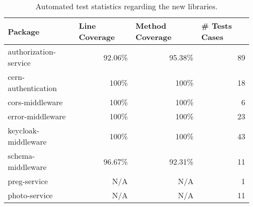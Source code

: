 \begin{table}[htbp]
\begin{tabular}{|l|r|r|r|}
\hline
Package & \multicolumn{1}{l|}{Line Coverage} & \multicolumn{1}{l|}{Method Coverage} & \multicolumn{1}{l|}{\# Tests Cases} \\ \hline
authorization-service & 92.06\% & 95.38\% & 89 \\ 
cern-authentication   & 100\%   & 100\%   & 18 \\ 
cors-middleware       & 100\%   & 100\%   & 6  \\ 
error-middleware      & 100\%   & 100\%   & 23 \\ 
keycloak-middleware   & 100\%   & 100\%   & 43 \\ 
schema-middleware     & 96.67\% & 92.31\% & 11 \\
preg-service          & N/A     & N/A     & 1  \\
photo-service         & N/A     & N/A     & 11 \\
\hline
\end{tabular}
\caption{Automated test statistics regarding the new libraries.}
\label{table:common-libs-test}
\end{table}

